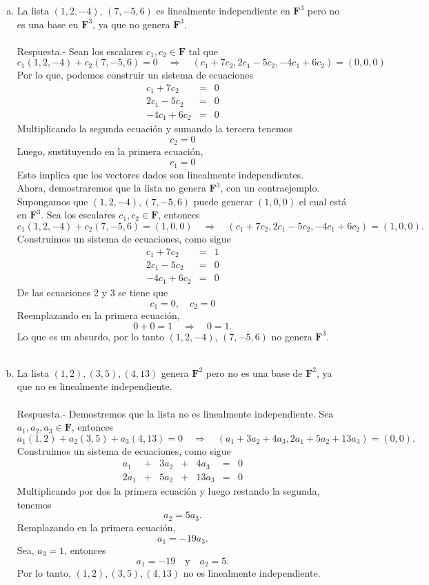 \begin{enumerate}[\bfseries 1.]
\begin{enumerate}[(a)]
	    \item La lista $(1,2,-4)$, $(7,-5,6)$ es linealmente independiente en $\textbf{F}^3$ pero no es una base en $\textbf{F}^3$, ya que no genera $\textbf{F}^3$.\\\\
		Respuesta.-\; Sean los escalares  $c_1,c_2\in \textbf{F}$ tal que
		$$c_1(1,2,-4)+c_2(7,-5,6)=0\quad \Rightarrow\quad (c_1+7c_2,2c_1-5c_2,-4c_1+6c_2)=(0,0,0)$$
		Por lo que, podemos construir un sistema de ecuaciones
		$$
		\begin{array}{rcl}
		    c_1+7c_2&=&0\\
		    2c_1-5c_2&=&0\\
		    -4c_1+6c_2&=&0
		\end{array}
		$$
		Multiplicando la segunda ecuación y sumando la tercera tenemos
		$$c_2=0$$
		Luego, sustituyendo en la primera ecuación, 
		$$c_1=0$$
		Esto implica que los vectores dados son linealmente independientes.\\
		Ahora, demostraremos que la lista no genera $\textbf{F}^3$, con un contraejemplo. Supongamos que $(1,2,-4),(7,-5,6)$ puede generar $(1,0,0)$ el cual está en $\textbf{F}^3$. Sea los escalares $c_1,c_2\in \textbf{F}$, entonces 
		$$c_1(1,2,-4)+c_2(7,-5,6)=(1,0,0)\quad \Rightarrow\quad (c_1+7c_2,2c_1-5c_2,-4c_1+6c_2)=(1,0,0).$$
		Construimos un sistema de ecuaciones, como sigue
		$$
		\begin{array}{rcl}
		    c_1+7c_2&=&1\\
		    2c_1-5c_2&=&0\\
		    -4c_1+6c_2&=&0
		\end{array}
		$$
		De las ecuaciones 2 y 3 se tiene que
		$$c_1=0,\quad c_2=0$$
		Reemplazando en la primera ecuación, 
		$$0+0=1\quad \Rightarrow\quad 0=1.$$
		Lo que es un absurdo, por lo tanto $(1,2,-4)$, $(7,-5,6)$ no genera $\textbf{F}^3$.\\\\

	    \item La lista $(1,2),(3,5),(4,13)$ genera $\textbf{F}^2$ pero no es una base de $\textbf{F}^2$, ya que no es linealmente independiente.\\\\
		Respuesta.-\; Demostremos que la lista no es linealmente independiente. Sea $a_1,a_2,a_3\in \textbf{F}$, entonces
		$$a_1(1,2)+a_2(3,5)+a_3(4,13)=0 \quad \Rightarrow \quad (a_1+3a_2+4a_3,2a_1+5a_2+13a_3)=(0,0).$$
		Construimos un sistema de ecuaciones, como sigue
		$$
		\begin{array}{*{7}{r}}
		    a_1&+&3a_2&+&4a_3&=&0\\
		    2a_1&+&5a_2&+&13a_3&=&0
		\end{array}
		$$
		Multiplicando por dos la primera ecuación y luego restando la segunda, tenemos
		$$a_2=5a_3.$$
		Remplazando en la primera ecuación,
		$$a_1=-19a_3.$$
		Sea, $a_3=1$, entonces
		$$a_1=-19\quad \mbox{y}\quad a_2=5.$$
		Por lo tanto, $(1,2),(3,5),(4,13)$ no es linealmente independiente.\\


\end{enumerate}
\end{enumerate}
